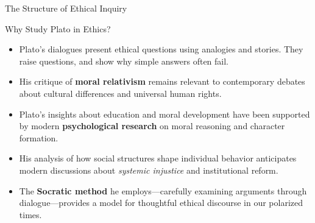 \documentclass[aspectratio=169]{beamer}
\begin{document}
\begin{frame}{The Structure of Ethical Inquiry}
\begin{center}
\end{center}
\end{frame}

\begin{frame}{Why Study Plato in Ethics?}
\begin{itemize}
\item Plato's dialogues present ethical questions using analogies and stories. They raise questions, and show why simple answers often fail.
\item His critique of \textbf{moral relativism} remains relevant to contemporary debates about cultural differences and universal human rights.
\item Plato's insights about education and moral development have been supported by modern \textbf{psychological research} on moral reasoning and character formation.
\item His analysis of how social structures shape individual behavior anticipates modern discussions about \emph{systemic injustice} and institutional reform.
\item The \textbf{Socratic method} he employs—carefully examining arguments through dialogue—provides a model for thoughtful ethical discourse in our polarized times.
\end{itemize}
\end{frame}
\end{document}
